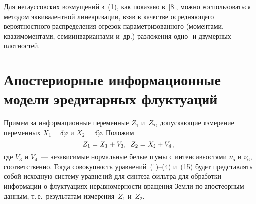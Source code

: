\begin{multicols}{2}
Для негауссовских возмущений в~(1), как показано в~[8], можно
воспользоваться методом эквивалентной линеаризации, взяв в качестве
осредняющего вероятностного распределения отрезок\linebreak
 параметризованного
(моментами, квазимоментами, семиинвариантами и~др.) разложения одно-
и двумерных плотностей.

\section{Апостериорные информационные модели эредитарных флуктуаций}

Примем за информационные переменные $Z_1$ и~$Z_2$, допускающие
измерение  переменных  $X_1=\delta \varphi$ и $X_2=\delta
\dot\varphi$. Положим
\begin{equation}
Z_1 = X_1+V_3,\enskip Z_2 = X_2 + V_4\,,
\end{equation}
где  $V_3$ и $V_4$~--- независимые нормальные белые шумы с
интенсивностями $\nu_5$ и $\nu_6$, соответственно. Тогда
совокупность уравнений~(1)--(4) и~(15) будет представлять собой
исходную систему уравнений для синтеза фильтра для обработки
информации о флуктуациях неравномерности вращения Земли по
апостеорным данным, т.\,е.\ результатам измерения~$Z_1$ и~$Z_2$.


\end{multicols}
